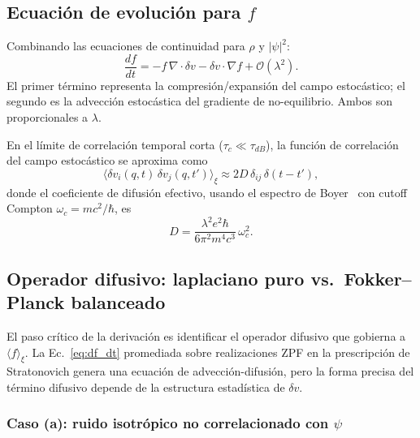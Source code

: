 \documentclass[11pt,a4paper]{article}
\begin{document}
\subsection{Ecuación de evolución para $f$}
\label{sec:evolucion_f}

Combinando las ecuaciones de continuidad para $\rho$ y $|\psi|^2$:
\begin{equation}
\frac{df}{dt} = -f\,\nabla\cdot\delta v - \delta v\cdot\nabla f
+\mathcal{O}(\lambda^2).
\label{eq:df_dt}
\end{equation}
El primer término representa la compresión/expansión del campo
estocástico; el segundo es la advección estocástica del gradiente de
no-equilibrio. Ambos son proporcionales a $\lambda$.

En el límite de correlación temporal corta ($\tau_c\ll\tau_{dB}$), la
función de correlación del campo estocástico se aproxima como
\begin{equation}
\langle\delta v_i(q,t)\,\delta v_j(q,t')\rangle_\xi
\approx 2D\,\delta_{ij}\,\delta(t-t'),
\label{eq:correlacion_delta_v}
\end{equation}
donde el coeficiente de difusión efectivo, usando el espectro de
Boyer~\cite{Boyer1975} con cutoff Compton $\omega_c=mc^2/\hbar$, es
\begin{equation}
D = \frac{\lambda^2 e^2\hbar}{6\pi^2 m^4 c^3}\,\omega_c^2.
\label{eq:D_Boyer}
\end{equation}

\subsection{Operador difusivo: laplaciano puro vs.\ Fokker--Planck balanceado}
\label{sec:operador_difusivo}

El paso crítico de la derivación es identificar el operador difusivo
que gobierna a $\langle f\rangle_\xi$. La Ec.~\eqref{eq:df_dt}
promediada sobre realizaciones ZPF en la prescripción de Stratonovich
genera una ecuación de advección-difusión, pero la forma precisa del
término difusivo depende de la estructura estadística de $\delta v$.

\subsubsection*{Caso (a): ruido isotrópico no correlacionado con $\psi$}
\end{document}
